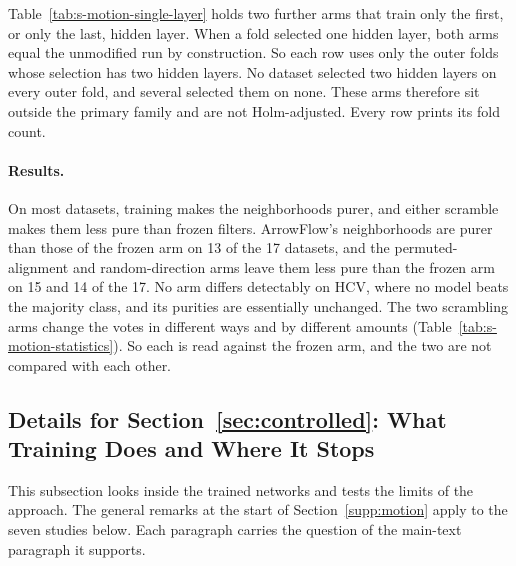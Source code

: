 Table~\ref{tab:s-motion-single-layer} holds two further arms that train only the first, or only the last, hidden layer. When a fold selected one hidden layer, both arms equal the unmodified run by construction. So each row uses only the outer folds whose selection has two hidden layers. No dataset selected two hidden layers on every outer fold, and several selected them on none. These arms therefore sit outside the primary family and are not Holm-adjusted. Every row prints its fold count.

\paragraph{Results.} On most datasets, training makes the neighborhoods purer, and either scramble makes them less pure than frozen filters. ArrowFlow's neighborhoods are purer than those of the frozen arm on 13 of the 17 datasets, and the permuted-alignment and random-direction arms leave them less pure than the frozen arm on 15 and 14 of the 17. No arm differs detectably on HCV, where no model beats the majority class, and its purities are essentially unchanged. The two scrambling arms change the votes in different ways and by different amounts (Table~\ref{tab:s-motion-statistics}). So each is read against the frozen arm, and the two are not compared with each other.

\clearpage






\clearpage
\subsection{Details for Section~\ref*{sec:controlled}: What Training Does and Where It Stops}\label{supp:controlled}

This subsection looks inside the trained networks and tests the limits of the approach. The general remarks at the start of Section~\ref{supp:motion} apply to the seven studies below. Each paragraph carries the question of the main-text paragraph it supports.

